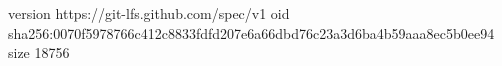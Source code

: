 version https://git-lfs.github.com/spec/v1
oid sha256:0070f5978766c412c8833fdfd207e6a66dbd76c23a3d6ba4b59aaa8ec5b0ee94
size 18756
